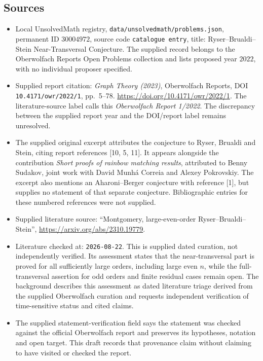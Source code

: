 \documentclass[11pt]{article}
\begin{document}
\subsection{Sources}
\begin{itemize}
\item Local UnsolvedMath registry, \texttt{data/unsolvedmath/problems.json}, permanent ID \(30004972\), source code \texttt{catalogue entry}, title: Ryser--Brualdi--Stein Near-Transversal Conjecture. The supplied record belongs to the Oberwolfach Reports Open Problems collection and lists proposed year \(2022\), with no individual proposer specified.
\item Supplied report citation: \emph{Graph Theory (2023)}, Oberwolfach Reports, DOI \texttt{10.4171/owr/2022/1}, pp.\ 5--78. \url{https://doi.org/10.4171/owr/2022/1}. The literature-source label calls this \emph{Oberwolfach Report 1/2022}. The discrepancy between the supplied report year and the DOI/report label remains unresolved.
\item The supplied original excerpt attributes the conjecture to Ryser, Brualdi and Stein, citing report references [10, 5, 11]. It appears alongside the contribution \emph{Short proofs of rainbow matching results}, attributed to Benny Sudakov, joint work with David Munh\'{a} Correia and Alexey Pokrovskiy. The excerpt also mentions an Aharoni--Berger conjecture with reference [1], but supplies no statement of that separate conjecture. Bibliographic entries for these numbered references were not supplied.
\item Supplied literature source: ``Montgomery, large-even-order Ryser--Brualdi--Stein'', \url{https://arxiv.org/abs/2310.19779}.
\item Literature checked at: \texttt{2026-08-22}. This is supplied dated curation, not independently verified. Its assessment states that the near-transversal part is proved for all sufficiently large orders, including large even \(n\), while the full-transversal assertion for odd orders and finite residual cases remain open. The background describes this assessment as dated literature triage derived from the supplied Oberwolfach curation and requests independent verification of time-sensitive status and cited claims.
\item The supplied statement-verification field says the statement was checked against the official Oberwolfach report and preserves its hypotheses, notation and open target. This draft records that provenance claim without claiming to have visited or checked the report.
\end{itemize}
\end{document}
